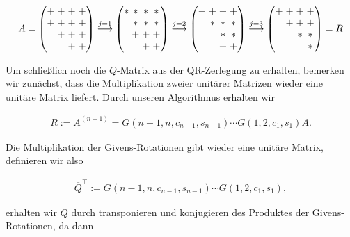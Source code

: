 \documentclass{article}
\theoremstyle{plain}
\begin{document}
\begin{align*}
\setlength\arraycolsep{1.5pt}
	A
	=
	\begin{pmatrix}
		+ & + & + & + \\
		+ & + & + & + \\
		& + & + & + \\
		& & +& + \\
	\end{pmatrix}
	\stackrel{j=1}{\longrightarrow}
	\begin{pmatrix}
		* & * & * & * \\
		 & * & * & * \\
		& + & + & + \\
		& & + &+ \\
	\end{pmatrix}
	\stackrel{j=2}{\longrightarrow}
	\begin{pmatrix}
		+ & + & + & + \\
		 & * & * & * \\
		&  & * & * \\
		& & +& + \\
	\end{pmatrix}
	\stackrel{j=3}{\longrightarrow}
	\begin{pmatrix}
		+ & + & + & + \\
		 & + & + & + \\
		&  & * & * \\
		& & & * \\
	\end{pmatrix}
	= R
\end{align*}

Um schließlich noch die $Q$-Matrix aus der QR-Zerlegung zu erhalten, bemerken wir zunächst, dass die Multiplikation zweier unitärer Matrizen wieder eine unitäre Matrix liefert. Durch unseren Algorithmus erhalten wir

\begin{align*}
R := A^{(n-1)} = G(n-1,n,c_{n-1},s_{n-1})\cdots G(1,2, c_1, s_1) A.
\end{align*}

Die Multiplikation der Givens-Rotationen gibt wieder eine unitäre Matrix, definieren wir also

\begin{align}
\overline{Q}^\top := G(n-1,n,c_{n-1},s_{n-1})\cdots G(1,2, c_1, s_1),
\label{Q_givens}
\end{align}

erhalten wir $Q$ durch transponieren und konjugieren des Produktes der Givens-Rotationen, da dann
\end{document}
